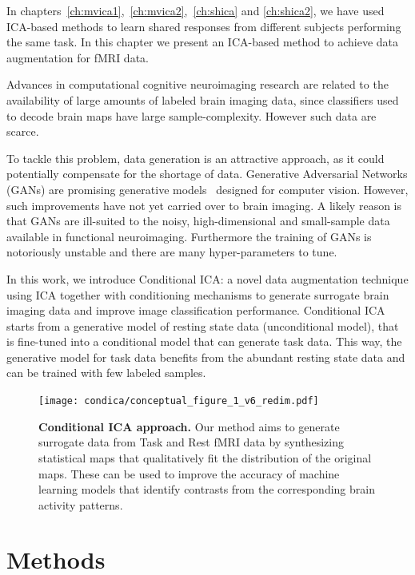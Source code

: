 In chapters~\ref{ch:mvica1},~\ref{ch:mvica2},~\ref{ch:shica} and
\ref{ch:shica2}, we have used ICA-based methods to learn shared responses from different
subjects performing the same task.
In this chapter we present an ICA-based method to achieve data augmentation for fMRI data.

  Advances in computational cognitive neuroimaging research are
  related to the availability of large amounts of labeled brain
imaging data, since classifiers used to decode brain maps have large
sample-complexity.
%
However such data are scarce.
%

To tackle this problem, data generation is an attractive approach, as
it could potentially compensate for the shortage of data.
Generative Adversarial Networks (GANs) are promising generative
models~\cite{goodfellow2014generative} designed for computer vision.
% 
However, such improvements have not yet carried over to brain imaging. A likely
reason is that GANs are ill-suited to the noisy, high-dimensional and
small-sample data available in functional neuroimaging. 
% 
Furthermore the training of GANs is notoriously unstable and there are many hyper-parameters to tune.
% 

  In this work, we introduce Conditional ICA: a novel data augmentation technique using ICA together with conditioning mechanisms to generate surrogate brain imaging data and improve image classification performance.
  Conditional ICA starts from a generative model of resting state data (unconditional model), that is fine-tuned into a conditional model that can generate task data. 
  This way, the generative model for task data benefits from the abundant
  resting state data and can be trained with few labeled samples.


%
\begin{figure}
\centerline{\texttt{[image: condica/conceptual\_figure\_1\_v6\_redim.pdf]}}
\caption{\textbf{Conditional ICA approach.} Our method aims to
  generate surrogate data from Task and Rest fMRI data by synthesizing
  statistical maps that qualitatively fit the distribution of the
  original maps. These can be used to improve the accuracy of
  machine learning models that identify contrasts from the
  corresponding brain activity patterns.}
\label{Fig0}
\end{figure}



\section{Methods}

